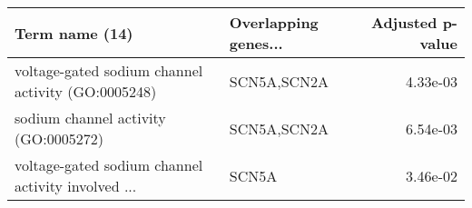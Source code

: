 \begin{tabular}{llr}
\toprule
                                    Term name (14) & Overlapping genes... &  Adjusted p-value \\
\midrule
voltage-gated sodium channel activity (GO:0005248) &          SCN5A,SCN2A &          4.33e-03 \\
              sodium channel activity (GO:0005272) &          SCN5A,SCN2A &          6.54e-03 \\
voltage-gated sodium channel activity involved ... &                SCN5A &          3.46e-02 \\
\bottomrule
\end{tabular}
